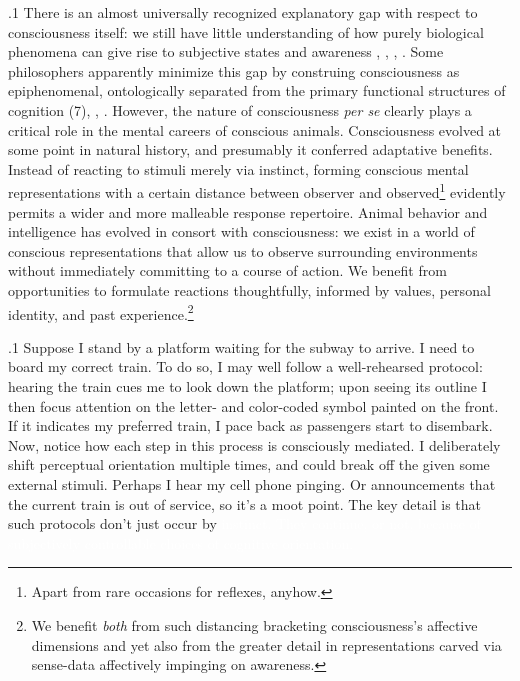 \documentclass[11pt, twocolumn]{article}
\begin{document}
\p.1{%
\:\+There is an almost universally recognized explanatory gap with respect
to consciousness itself: we still have little understanding of
how purely biological phenomena can give rise to subjective
 states and awareness , ,
, . \> Some philosophers
apparently minimize this gap by construing consciousness as epiphenomenal,
ontologically \pgl{}separated from the primary functional structures
of cognition (7), ,
. \> However, the
nature of consciousness \textit{per se} clearly
plays a critical role in the mental careers of conscious animals.
Consciousness evolved at some point in natural history, and presumably
it conferred adaptative benefits. \> Instead of reacting to stimuli
merely via instinct, forming conscious mental representations
\mdash{} with a certain distance between observer and
observed\footnote{Apart from rare occasions for
 reflexes, anyhow.} \mdash{}
evidently permits a wider and more malleable response
repertoire. \> Animal behavior and intelligence
has evolved in consort with consciousness: we exist in a world
of conscious representations that allow us to observe
surrounding environments without immediately committing to a
course of action. \> We benefit
from opportunities to formulate reactions thoughtfully, informed
by values, personal identity, and past 
experience.\<\footnote{\+We benefit
\textit{both} from \label{fn:benefit}such
distancing \mdash{} bracketing consciousness's affective
dimensions \mdash{} and yet also from the greater detail in
representations carved via sense-data affectively
impinging on awareness.\<}\;\condenlargepage{1em}
} %

\p.1{%
\:\+Suppose I stand by a platform waiting for the subway to arrive.  I need to board
my correct train. \> To do so, I may well follow a well-rehearsed
protocol: hearing the train cues me to look down the platform; upon seeing
its outline I then focus attention on the letter- and color-coded
symbol painted on the front. \> If it indicates my preferred train,
I pace back as passengers start to disembark. \> Now, notice how each step in this process is consciously mediated. \> I deliberately shift 
perceptual orientation multiple
times, and could break off the  given some external
stimuli. \> Perhaps I hear my cell phone pinging. \> Or announcements
that the current train is out of service, so it's a moot point. \> The key
detail is that such protocols don't just occur by
\textcolor{white}{instinct.  They continue,
or not, because of subjectively controllable choices of cognitive orientation.}
} %
\end{document}
